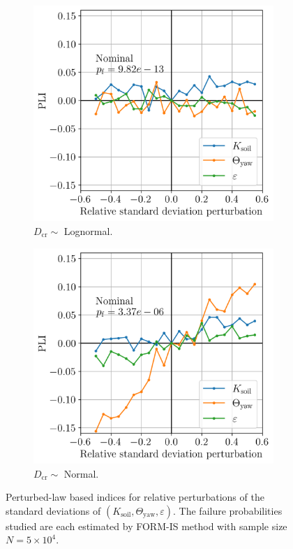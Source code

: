 \begin{figure}
    \centering
    \begin{subfigure}[t]{0.48\linewidth}
        \includegraphics[width=\linewidth]{./part3/figures/OWT/PLI_ALL_Hyp_LogNormal.png}
        \caption{$D_{\mathrm{cr}} \sim $ Lognormal.}
    \end{subfigure}
    \begin{subfigure}[t]{0.48\linewidth}
        \includegraphics[width=\linewidth]{./part3/figures/OWT/PLI_ALL_Hyp_Normal.png}
        \caption{$D_{\mathrm{cr}} \sim $ Normal.}
    \end{subfigure}
    \caption{Perturbed-law based indices for relative perturbations of the standard deviations of $(K_{\mathrm{soil}}, \Theta_{\mathrm{yaw}}, \varepsilon)$. 
    The failure probabilities studied are each estimated by FORM-IS method with sample size $N=5 \times 10^4$.}
    \label{fig:pli_all}
\end{figure}


